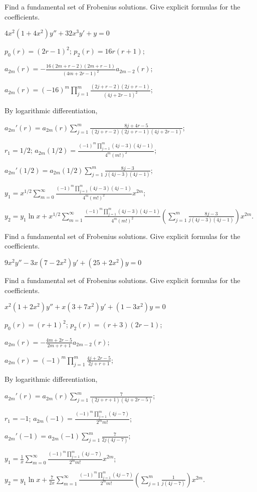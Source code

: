 \documentclass{ximera}
\begin{document}
\begin{problem}\label{exer:7.6.36}
Find a
fundamental set of Frobenius solutions. Give explicit formulas for the
coefficients.

$4x^2(1+4x^2)y''+32x^3y'+y=0$

\begin{solution}
    $p_0(r)=(2r-1)^2$;
$p_2(r)=16r(r+1)$;

$a_{2m}(r)=-\frac{16(2m+r-2)(2m+r-1)}{(4m+2r-1)^2}
a_{2m-2}(r)$;


$a_{2m}(r)=(-16)^m\prod_{j=1}^m\frac{(2j+r-2)(2j+r-1)}{(4j+2r-1)^2}$;

By logarithmic differentiation,

$a_{2m}'(r)=
a_{2m}(r)\sum_{j=1}^m\frac{8j+4r-5}{(2j+r-2)(2j+r-1)(4j+2r-1)}$;

$r_1=1/2$;
$a_{2m}(1/2)=\frac{(-1)^m\prod_{j=1}^m(4j-3)(4j-1)}{4^m(m!)^2}$;

$a_{2m}'(1/2)=a_{2m}(1/2)\sum_{j=1}^m\frac{8j-3}{ j(4j-3) (4j-1)}$;


$y_1=x^{1/2}\sum_{m=0}^\infty\frac{(-1)^m\prod_{j=1}^m(4j-3)(4j-1)}{4^m(m!)^2}
x^{2m}$;

$y_2=y_1\ln
x+x^{1/2}\sum_{m=1}^\infty\frac{(-1)^m\prod_{j=1}^m(4j-3)(4j-1)}{4^m(m!)^2}
\left(\sum_{j=1}^m\frac{8j-3}{ j(4j-3) (4j-1)}\right)x^{2m}$.

\end{solution}
\end{problem}

\begin{problem}\label{exer:7.6.37}
Find a
fundamental set of Frobenius solutions. Give explicit formulas for the
coefficients.

$9x^2y''-3x(7-2x^2)y'+(25+2x^2)y=0$
\end{problem}

\begin{problem}\label{exer:7.6.38}
Find a
fundamental set of Frobenius solutions. Give explicit formulas for the
coefficients.

$x^2(1+2x^2)y''+x(3+7x^2)y'+(1-3x^2)y=0$

\begin{solution}
    $p_0(r)=(r+1)^2$;
$p_2(r)=(r+3)(2r-1)$;

$a_{2m}(r)=-\frac{4m+2r-5}{2m+r+1}
a_{2m-2}(r)$;

 $a_{2m}(r)=(-1)^m\prod_{j=1}^m\frac{4j+2r-5}{2j+r+1}$;

By logarithmic differentiation,

$a_{2m}'(r)= a_{2m}(r)\sum_{j=1}^m\frac{7}{(2j+r+1)(4j+2r-5)}$;

$r_1=-1$;
$a_{2m}(-1)=\frac{(-1)^m\prod_{j=1}^m(4j-7)}{2^mm!}$;

$a_{2m}'(-1)=a_{2m}(-1)\sum_{j=1}^m\frac{7}{2j(4j-7)}$;

$y_1=\frac{1}{ x
}\sum_{m=0}^\infty\frac{(-1)^m\prod_{j=1}^m(4j-7)}{2^mm!} x^{2m}$;

$y_2=y_1\ln
x+\frac{7}{2x}\sum_{m=1}^\infty\frac{(-1)^m\prod_{j=1}^m(4j-7)}{2^mm!}
\left(\sum_{j=1}^m\frac{1}{ j(4j-7)}\right)x^{2m}$.
\end{solution}
\end{problem}
\end{document}

